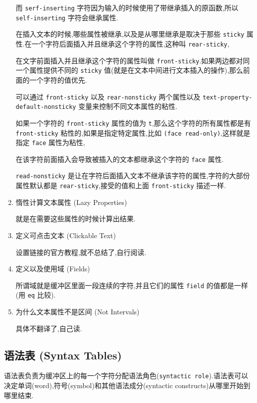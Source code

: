 \documentclass[11pt]{article}
\begin{document}
\begin{enumerate}
而 \texttt{serf-inserting} 字符因为输入的时候使用了带继承插入的原函数,所以 \texttt{self-inserting} 字符会继承属性.

在插入文本的时候,哪些属性被继承,以及是从哪里继承是取决于那些 \texttt{sticky} 属性.在一个字符后面插入并且继承这个字符的属性,这种叫 \texttt{rear-sticky},

在文字前面插入并且继承这个字符的属性叫做 \texttt{front-sticky}.如果两边都对同一个属性提供不同的 \texttt{sticky} 值(就是在文本中间进行文本插入的操作),那么前面的一个字符的值优先.

可以通过 \texttt{front-sticky} 以及 \texttt{rear-nonsticky} 两个属性以及 \texttt{text-property-default-nonsticky} 变量来控制不同文本属性的粘性.

如果一个字符的 \texttt{front-sticky} 属性的值为 \texttt{t},那么这个字符的所有属性都是有 \texttt{front-sticky} 粘性的,如果是指定特定属性,比如 \texttt{(face read-only)},这样就是指定 \texttt{face} 属性为粘性,

在该字符前面插入会导致被插入的文本都继承这个字符的 \texttt{face} 属性.

\texttt{read-nonsticky} 是让在字符后面插入文本不继承该字符的属性,字符的大部份属性默认都是 \texttt{rear-sticky},接受的值和上面 \texttt{front-sticky} 描述一样.


\item 惰性计算文本属性 (Lazy Properties)
\label{sec:org63baa9e}

就是在需要这些属性的时候计算出结果.


\item 定义可点击文本 (Clickable Text)
\label{sec:orge283913}

设置链接的官方教程,就不总结了,自行阅读.


\item 定义以及使用域 (Fields)
\label{sec:org41b4904}

所谓域就是缓冲区里面一段连续的字符,并且它们的属性 \texttt{field} 的值都是一样(用 \texttt{eq} 比较).


\item 为什么文本属性不是区间 (Not Intervals)
\label{sec:org6b39cba}

具体不翻译了,自己读.
\end{enumerate}


\subsection{语法表 (Syntax Tables)}
\label{sec:orgc4e8fa3}

语法表负责为缓冲区上的每一个字符分配语法角色(\texttt{syntactic role}).语法表可以决定单词(word),符号(symbol)和其他语法成分(syntactic constructs)从哪里开始到哪里结束.
\end{document}
